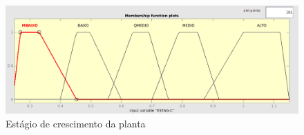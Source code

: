 \begin{figure}[h!]
\centering
\includegraphics[width=1\linewidth]{Descricao/Imagens/ESTAG-C}
\caption{Estágio de crescimento da planta}
\label{fig:ESTAG-C}
\end{figure}

